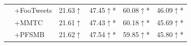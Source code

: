 \begin{tabular}{llcccc}
 & +FooTweets & 21.63\colorbox{mygreen}{$\uparrow$} & 47.45\colorbox{mygreen}{$\uparrow$}* & 60.08\colorbox{mygreen}{$\uparrow$}* & 46.09\colorbox{mygreen}{$\uparrow$}* \\
 & +MMTC & 21.61\colorbox{mygreen}{$\uparrow$} & 47.43\colorbox{mygreen}{$\uparrow$}* & 60.18\colorbox{mygreen}{$\uparrow$}* & 45.69\colorbox{mygreen}{$\uparrow$}* \\
 & +PFSMB & 21.62\colorbox{mygreen}{$\uparrow$} & 47.54\colorbox{mygreen}{$\uparrow$}* & 59.85\colorbox{mygreen}{$\uparrow$}* & 45.80\colorbox{mygreen}{$\uparrow$}* \\
\bottomrule
\end{tabular}
